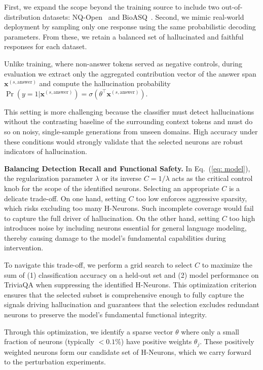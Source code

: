 \documentclass[dvipsnames]{article}
\begin{document}
First, we expand the scope beyond the training source to include two out-of-distribution datasets: NQ-Open~\citep{nq} and BioASQ~\citep{bioasq}. Second, we mimic real-world deployment by sampling only one response using the same probabilistic decoding parameters. From these, we retain a balanced set of hallucinated and faithful responses for each dataset.

Unlike training, where non-answer tokens served as negative controls, during evaluation we extract only the aggregated contribution vector of the answer span \(\mathbf{x}^{(s,\text{answer})}\) and compute the hallucination probability $\Pr(y=1|\mathbf{x}^{(s,\text{answer})}) = \sigma(\theta^\top \mathbf{x}^{(s,\text{answer})})$.

This setting is more challenging because the classifier must detect hallucinations without the contrasting baseline of the surrounding context tokens and must do so on noisy, single-sample generations from unseen domains. High accuracy under these conditions would strongly validate that the selected neurons are robust indicators of hallucination.


\textbf{Balancing Detection Recall and Functional Safety.}\quad
In Eq.~(\ref{eq: model}), the regularization parameter \(\lambda\) or its inverse \(C=1/\lambda\) acts as the critical control knob for the scope of the identified neurons.
Selecting an appropriate \(C\) is a delicate trade-off. On one hand, setting \(C\) too low enforces aggressive sparsity, which risks excluding too many H-Neurons. Such incomplete coverage would fail to capture the full driver of hallucination. On the other hand, setting \(C\) too high introduces noise by including neurons essential for general language modeling, thereby causing damage to the model's fundamental capabilities during intervention.

To navigate this trade-off, we perform a grid search to select \(C\) to maximize the sum of (1) classification accuracy on a held-out set and (2) model performance on TriviaQA when suppressing the identified H-Neurons. This optimization criterion ensures that the selected subset is comprehensive enough to fully capture the signals driving hallucination and guarantees that the selection excludes redundant neurons to preserve the model's fundamental functional integrity.

Through this optimization, we identify a sparse vector \(\theta\) where only a small fraction of neurons (typically \(<0.1\%\)) have positive weights \(\theta_j\). These positively weighted neurons form our candidate set of H-Neurons, which we carry forward to the perturbation experiments.
\end{document}
